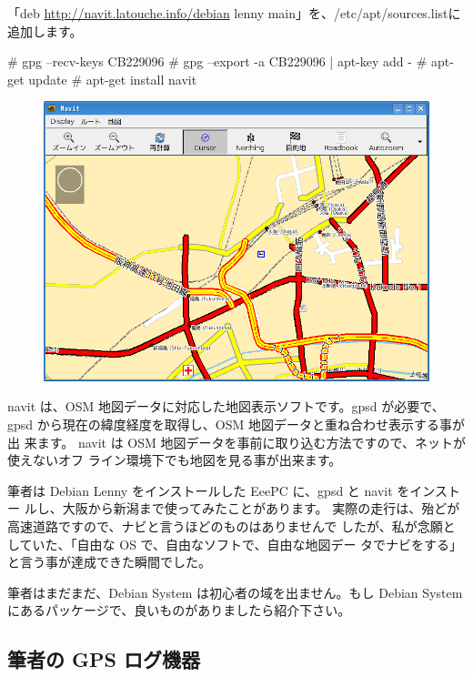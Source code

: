 \documentclass[mingoth,a4paper]{jsarticle}
\begin{document}
「deb \url{http://navit.latouche.info/debian} lenny main」を、/etc/apt/sources.listに追加します。

\begin{commandline}
# gpg --recv-keys CB229096
# gpg --export -a CB229096 | apt-key add -
# apt-get update
# apt-get install navit
\end{commandline}

\begin{figure}
 \includegraphics[scale=0.38]{image200912/debianosm8.png}
\end{figure}

navit は、OSM 地図データに対応した地図表示ソフトです。gpsd が必要で、
gpsd から現在の緯度経度を取得し、OSM 地図データと重ね合わせ表示する事が出
来ます。
navit は OSM 地図データを事前に取り込む方法ですので、ネットが使えないオフ
ライン環境下でも地図を見る事が出来ます。

筆者は Debian Lenny をインストールした EeePC に、gpsd と navit をインストー
ルし、大阪から新潟まで使ってみたことがあります。
実際の走行は、殆どが高速道路ですので、ナビと言うほどのものはありませんで
したが、私が念願としていた、「自由な OS で、自由なソフトで、自由な地図デー
タでナビをする」と言う事が達成できた瞬間でした。

筆者はまだまだ、Debian System は初心者の域を出ません。もし Debian System
にあるパッケージで、良いものがありましたら紹介下さい。

\subsection{筆者の GPS ログ機器}
\end{document}
